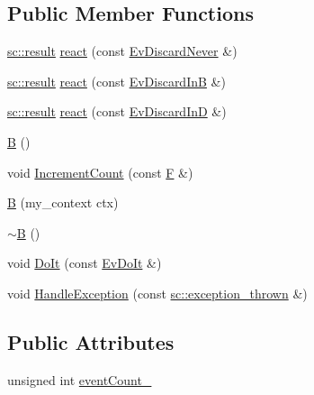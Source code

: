 \subsection*{Public Member Functions}
\begin{DoxyCompactItemize}
\item 
\mbox{\hyperlink{namespaceboost_1_1statechart_abe807f6598b614d6d87bb951ecd92331}{sc\+::result}} \mbox{\hyperlink{struct_b_add69d6626a14cef8f58929dfbe940cb9}{react}} (const \mbox{\hyperlink{struct_ev_discard_never}{Ev\+Discard\+Never}} \&)
\item 
\mbox{\hyperlink{namespaceboost_1_1statechart_abe807f6598b614d6d87bb951ecd92331}{sc\+::result}} \mbox{\hyperlink{struct_b_af883c81d64b442ed4252a406a2710459}{react}} (const \mbox{\hyperlink{struct_ev_discard_in_b}{Ev\+Discard\+InB}} \&)
\item 
\mbox{\hyperlink{namespaceboost_1_1statechart_abe807f6598b614d6d87bb951ecd92331}{sc\+::result}} \mbox{\hyperlink{struct_b_a6ef8f2fd99e04b465b39ea65056ebc10}{react}} (const \mbox{\hyperlink{struct_ev_discard_in_d}{Ev\+Discard\+InD}} \&)
\item 
\mbox{\hyperlink{struct_b_a9532a74021f7efb003dffbc9d4145e65}{B}} ()
\item 
void \mbox{\hyperlink{struct_b_a862e39288b607fcc7e71f9fa07c0cd20}{Increment\+Count}} (const \mbox{\hyperlink{struct_f}{F}} \&)
\item 
\mbox{\hyperlink{struct_b_a8d6359453d0d6206098cf1980b6c7495}{B}} (my\+\_\+context ctx)
\item 
\mbox{\hyperlink{struct_b_abf3bb815dcba0116aee6f0e87d694702}{$\sim$B}} ()
\item 
void \mbox{\hyperlink{struct_b_ad8417b0b86326962007c13d75094330e}{Do\+It}} (const \mbox{\hyperlink{struct_ev_do_it}{Ev\+Do\+It}} \&)
\item 
void \mbox{\hyperlink{struct_b_a8eb80df2fcfde5209e4800f5aec2d7a5}{Handle\+Exception}} (const \mbox{\hyperlink{classboost_1_1statechart_1_1exception__thrown}{sc\+::exception\+\_\+thrown}} \&)
\end{DoxyCompactItemize}
\subsection*{Public Attributes}
\begin{DoxyCompactItemize}
\item 
unsigned int \mbox{\hyperlink{struct_b_a1a60275928b3599e275f5ba2c34b3a1b}{event\+Count\+\_\+}}
\end{DoxyCompactItemize}
